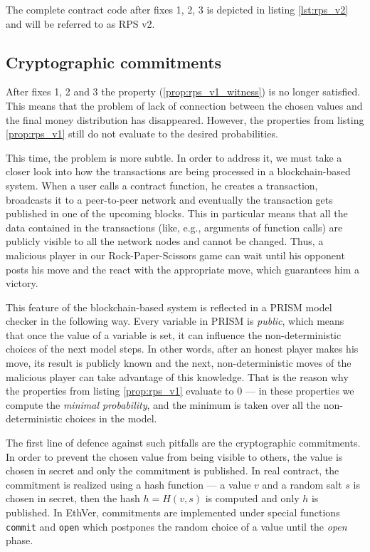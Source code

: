 The complete contract code after fixes 1, 2, 3 is depicted in listing \ref{lst:rps_v2} and will be referred to as RPS v2.



\subsection{Cryptographic commitments}

After fixes 1, 2 and 3 the property (\ref{prop:rps_v1_witness}) is no longer satisfied.
This means that the problem of lack of connection between the chosen values and the final money distribution
has disappeared.
However, the properties from listing \ref{prop:rps_v1} still do not evaluate to the desired probabilities.

This time, the problem is more subtle.
In order to address it, we must take a closer look into how the transactions are being processed
in a blockchain-based system.
When a user calls a contract function, he creates a transaction, broadcasts it to a peer-to-peer network and 
eventually the transaction gets published in one of the upcoming blocks.
This in particular means that all the data contained in the transactions (like, e.g., arguments of function calls)
are publicly visible to all the network nodes and cannot be changed.
Thus, a malicious player in our Rock-Paper-Scissors game can wait until his opponent posts his move and 
the react with the appropriate move, which guarantees him a victory.

This feature of the blockchain-based system is reflected in a PRISM model checker in the following way.
Every variable in PRISM is \emph{public}, which means that once the value of a variable is set, it can influence
the non-deterministic choices of the next model steps.
In other words, after an honest player makes his move, its result is publicly known and the next, non-deterministic
moves of the malicious player can take advantage of this knowledge.
That is the reason why the properties from listing \ref{prop:rps_v1} evaluate to 0 --- in these properties we compute the
\emph{minimal probability}, and the minimum is taken over all the non-deterministic choices in the model.

The first line of defence against such pitfalls are the cryptographic commitments.
In order to prevent the chosen value from being visible to others, the value is chosen in secret and only
the commitment is published.
In real contract, the commitment is realized using a hash function --- a value $v$ and a random salt $s$ is chosen
in secret, then the hash $h = H(v, s)$ is computed and only $h$ is published.
In EthVer, commitments are implemented under special functions \lstinline{commit} and \lstinline{open} which
postpones the random choice of a value until the \emph{open} phase.

